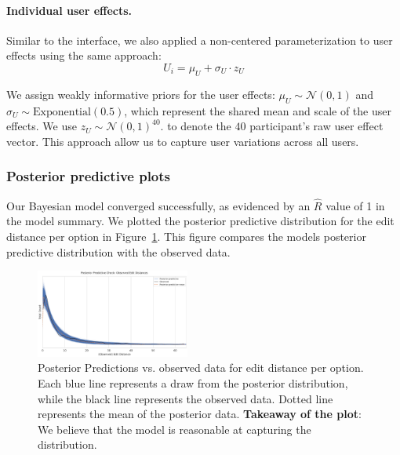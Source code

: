 \paragraph{Individual user effects.} 
Similar to the interface, we also applied a non-centered parameterization to user effects using the same approach:
\begin{equation}\label{eq:distance_model_1_user_effect}
    U_i = \mu_U + \sigma_U \cdot z_U 
\end{equation}

We assign weakly informative priors for the user effects: $\mu_U \sim \mathcal{N}(0,1)$ and $\sigma_U \sim \mathrm{Exponential}(0.5)$, which represent the shared mean and scale of the user effects. We use $z_U \sim \mathcal{N}(0,1)^{40}.$ to denote the $40$ participant's raw user effect vector. This approach allow us to capture user variations across all users.

\subsubsection{Posterior predictive plots}
Our Bayesian model converged successfully, as evidenced by an $\hat{R}$ value of 1 in the model summary. We plotted the posterior predictive distribution for the edit distance per option in Figure~\ref{fig:ppc_distance_m1}. This figure compares the models posterior predictive distribution with the observed data. 

\begin{figure}[h!]
    \centering
    \includegraphics[width=0.45\textwidth]{content/image/distance/ppc_distance_m1.pdf}
    \caption{Posterior Predictions vs. observed data for edit distance per option. Each blue line represents a draw from the posterior distribution, while the black line represents the observed data. Dotted line represents the mean of the posterior data. \textbf{Takeaway of the plot}: We believe that the model is reasonable at capturing the distribution.}
    \label{fig:ppc_distance_m1}
\end{figure}


